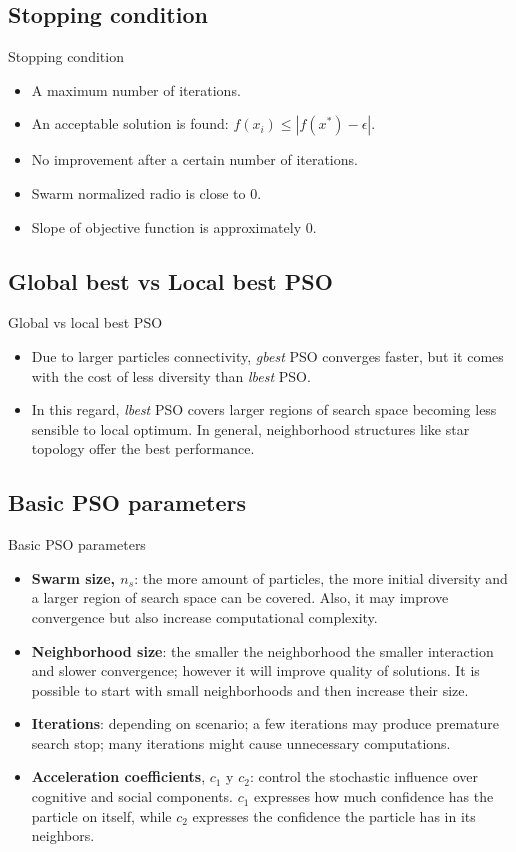 \documentclass[aspectratio=169,compress,10pt]{beamer}
\begin{document}
\subsection{Stopping condition}
\begin{frame}{Stopping condition}
\begin{itemize}
	\item A maximum number of iterations.
	\item An acceptable solution is found: $f(x_i) \leq |f(x^*) - \epsilon |$.
	\item No improvement after a certain number of iterations.
	\item Swarm normalized radio is close to 0.
	\item Slope of objective function is approximately 0.
\end{itemize}
\end{frame}

\subsection{Global best vs Local best PSO}
\begin{frame}{Global vs local best PSO}
\begin{itemize}
	\item Due to larger particles connectivity, \emph{gbest} PSO converges faster, but it comes with the cost of less diversity than \emph{lbest} PSO.
	\item In this regard, \emph{lbest} PSO covers larger regions of search space becoming less sensible to local optimum.
	In general, neighborhood structures like star topology offer the best performance.
\end{itemize}
\end{frame}


\subsection{Basic PSO parameters}
\begin{frame}{Basic PSO parameters}
\begin{itemize}
	\item \textbf{Swarm size, $n_s$}: the more amount of particles, the more initial diversity and a larger region of search space can be covered.
	Also, it may improve convergence but also increase computational complexity.
	\item \textbf{Neighborhood size}: the smaller the neighborhood the smaller interaction and slower convergence; however it will improve quality of solutions.
	It is possible to start with small neighborhoods and then increase their size.
	\item \textbf{Iterations}: depending on scenario; a few iterations may produce premature search stop; many iterations might cause unnecessary computations.
	\item \textbf{Acceleration coefficients}, $c_1$ y $c_2$: control the stochastic influence over cognitive and social components. 
	$c_1$ expresses how much confidence has the particle on itself, while  $c_2$ expresses the confidence the particle has in its neighbors.
\end{itemize}
\end{frame}
\end{document}
